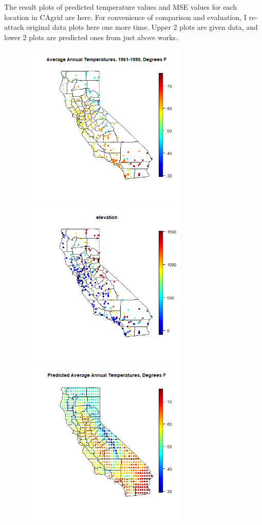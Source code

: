 \documentclass{article}
\begin{document}
\clearpage
The result plots of predicted temperature values and MSE values for each location in CAgrid are here.
For convenience of comparison and evaluation, I re-attach original data plots here one more time.
Upper 2 plots are given data, and lower 2 plots are predicted ones from just above works.

\begin{figure}[!h]
    \includegraphics[height=8cm]{prob2_CAtemp_avgtemp.png} 
    \includegraphics[height=8cm]{prob2_CAtemp_elevation.png} \\
    \includegraphics[height=8cm]{prob2_CAgrid_predicted_mean.png}

\end{figure}
\end{document}
